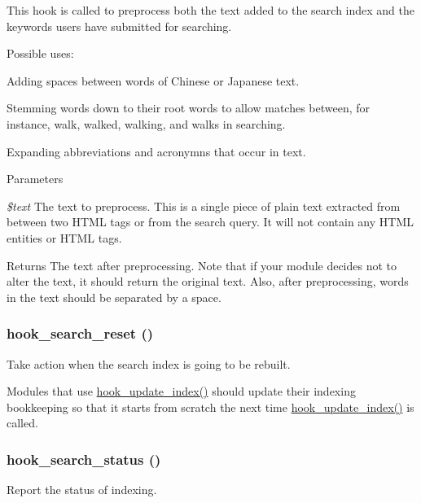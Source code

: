 This hook is called to preprocess both the text added to the search index and the keywords users have submitted for searching.

Possible uses:
\begin{DoxyItemize}
\item Adding spaces between words of Chinese or Japanese text.
\item Stemming words down to their root words to allow matches between, for instance, walk, walked, walking, and walks in searching.
\item Expanding abbreviations and acronymns that occur in text.
\end{DoxyItemize}


\begin{DoxyParams}{Parameters}
\item[{\em \$text}]The text to preprocess. This is a single piece of plain text extracted from between two HTML tags or from the search query. It will not contain any HTML entities or HTML tags.\end{DoxyParams}
\begin{DoxyReturn}{Returns}
The text after preprocessing. Note that if your module decides not to alter the text, it should return the original text. Also, after preprocessing, words in the text should be separated by a space. 
\end{DoxyReturn}
\hypertarget{group__search_gaefc7ab0e4a53a2752371dcccaec41deb}{
\subsubsection[{hook\_\-search\_\-reset}]{\setlength{\rightskip}{0pt plus 5cm}hook\_\-search\_\-reset ()}}
\label{group__search_gaefc7ab0e4a53a2752371dcccaec41deb}
Take action when the search index is going to be rebuilt.

Modules that use \hyperlink{group__search_ga23d6f6642bd53c4f033f10e9c1b12d43}{hook\_\-update\_\-index()} should update their indexing bookkeeping so that it starts from scratch the next time \hyperlink{group__search_ga23d6f6642bd53c4f033f10e9c1b12d43}{hook\_\-update\_\-index()} is called. \hypertarget{group__search_gafb7f508058afed4fe670974b82b072f2}{
\subsubsection[{hook\_\-search\_\-status}]{\setlength{\rightskip}{0pt plus 5cm}hook\_\-search\_\-status ()}}
\label{group__search_gafb7f508058afed4fe670974b82b072f2}
Report the status of indexing.

